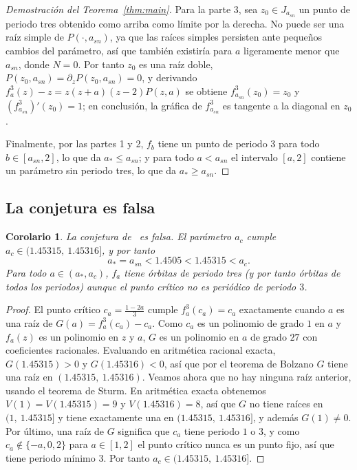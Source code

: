 \documentclass[12pt,a4paper]{report}
\newtheorem{corolario}{Corolario}[section]
\theoremstyle{definition}
\begin{document}
\begin{proof}[Demostración del Teorema~\ref{thm:main}]
Para la parte 3, sea $z_0\in J_{a_{sn}}$ un punto de periodo tres obtenido como arriba como límite por la derecha. No puede ser una raíz simple de $P(\cdot,a_{sn})$, ya que las raíces simples persisten ante pequeños cambios del parámetro, así que también existiría para $a$ ligeramente menor que $a_{sn}$, donde $N=0$. Por tanto $z_0$ es una raíz doble, $P(z_0,a_{sn}) = \partial_z P(z_0,a_{sn}) = 0$, y derivando $f_a^3(z)-z = z(z+a)(z-2)P(z,a)$ se obtiene $f_{a_{sn}}^3(z_0)=z_0$ y $(f_{a_{sn}}^3)'(z_0)=1$; en conclusión, la gráfica de $f_{a_{sn}}^3$ es tangente a la diagonal en $z_0$.

Finalmente, por las partes 1 y 2, $f_b$ tiene un punto de periodo $3$ para todo $b\in[a_{sn},2]$, lo que da $a_*\le a_{sn}$; y para todo $a<a_{sn}$ el intervalo $[a,2]$ contiene un parámetro sin periodo tres, lo que da $a_*\ge a_{sn}$.
\end{proof}

\subsection*{La conjetura es falsa}

\begin{corolario}\label{cor:conj}
La conjetura de~\cite{chen2024} es falsa. El parámetro $a_c$ cumple $a_c\in(1.45315,\ 1.45316]$, y por tanto
\[
a_* = a_{sn} < 1.4505 < 1.45315 < a_c .
\]
Para todo $a\in(a_*,a_c)$, $f_a$ tiene órbitas de periodo tres (y por tanto órbitas de todos los periodos) aunque el punto crítico no es periódico de periodo $3$.
\end{corolario}

\begin{proof}
El punto crítico $c_a=\frac{1-2a}{3}$ cumple $f_a^3(c_a)=c_a$ exactamente cuando $a$ es una raíz de $G(a) = f_a^3(c_a) - c_a$. Como $c_a$ es un polinomio de grado $1$ en $a$ y $f_a(z)$ es un polinomio en $z$ y $a$, $G$ es un polinomio en $a$ de grado $27$ con coeficientes racionales. Evaluando en aritmética racional exacta, $G(1.45315)>0$ y $G(1.45316)<0$, así que por el teorema de Bolzano $G$ tiene una raíz en $(1.45315,\ 1.45316)$. Veamos ahora que no hay ninguna raíz anterior, usando el teorema de Sturm. En aritmética exacta obtenemos $V(1)=V(1.45315)=9$ y $V(1.45316)=8$, así que $G$ no tiene raíces en $(1,\ 1.45315]$ y tiene exactamente una en $(1.45315,\ 1.45316]$, y además $G(1)\neq0$. Por último, una raíz de $G$ significa que $c_a$ tiene periodo $1$ o $3$, y como $c_a\notin\{-a,0,2\}$ para $a\in[1,2]$ el punto crítico nunca es un punto fijo, así que tiene periodo mínimo $3$. Por tanto $a_c\in(1.45315,\ 1.45316]$.
\end{proof}
\end{document}
